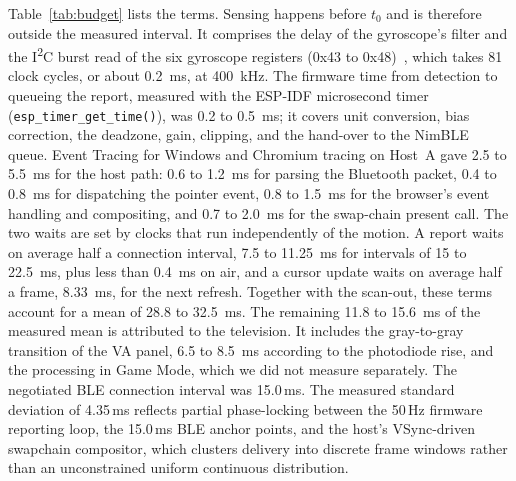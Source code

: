 \documentclass[journal]{IEEEtran}
\begin{document}
Table~\ref{tab:budget} lists the terms. Sensing happens before $t_0$ and is therefore outside the measured interval. It comprises the delay of the gyroscope's filter and the I\textsuperscript{2}C burst read of the six gyroscope registers (0x43 to 0x48)~\cite{mpu6886}, which takes 81 clock cycles, or about 0.2~ms, at 400~kHz. The firmware time from detection to queueing the report, measured with the ESP-IDF microsecond timer (\texttt{esp\_timer\_get\_time()}), was 0.2 to 0.5~ms; it covers unit conversion, bias correction, the deadzone, gain, clipping, and the hand-over to the NimBLE queue. Event Tracing for Windows and Chromium tracing on Host~A gave 2.5 to 5.5~ms for the host path: 0.6 to 1.2~ms for parsing the Bluetooth packet, 0.4 to 0.8~ms for dispatching the pointer event, 0.8 to 1.5~ms for the browser's event handling and compositing, and 0.7 to 2.0~ms for the swap-chain present call. The two waits are set by clocks that run independently of the motion. A report waits on average half a connection interval, 7.5 to 11.25~ms for intervals of 15 to 22.5~ms, plus less than 0.4~ms on air, and a cursor update waits on average half a frame, 8.33~ms, for the next refresh. Together with the scan-out, these terms account for a mean of 28.8 to 32.5~ms. The remaining 11.8 to 15.6~ms of the measured mean is attributed to the television. It includes the gray-to-gray transition of the VA panel, 6.5 to 8.5~ms according to the photodiode rise, and the processing in Game Mode, which we did not measure separately. The negotiated BLE connection interval was 15.0\,ms. The measured standard deviation of 4.35\,ms reflects partial phase-locking between the 50\,Hz firmware reporting loop, the 15.0\,ms BLE anchor points, and the host's VSync-driven swapchain compositor, which clusters delivery into discrete frame windows rather than an unconstrained uniform continuous distribution.
\end{document}
